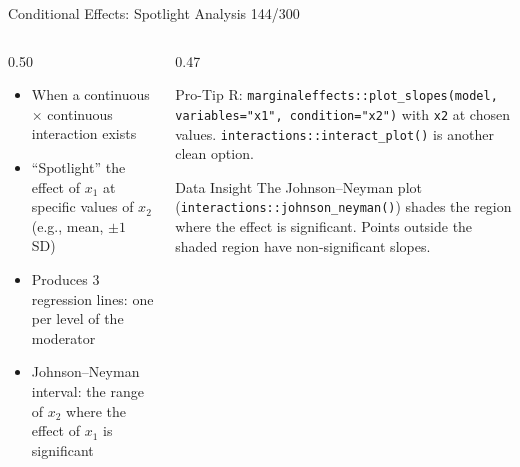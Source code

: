 \documentclass[10pt]{beamer}
\newcommand{\smark}[1]{\hfill{\scriptsize\color{codegray}#1}}
\begin{document}
\begin{frame}{Conditional Effects: Spotlight Analysis}
\smark{144/300}
\begin{columns}[T]
\begin{column}{0.50\textwidth}
\begin{itemize}
    \item When a continuous $\times$ continuous interaction exists
    \item ``Spotlight'' the effect of $x_1$ at specific values of $x_2$ (e.g., mean, $\pm 1$ SD)
    \item Produces 3 regression lines: one per level of the moderator
    \item Johnson--Neyman interval: the range of $x_2$ where the effect of $x_1$ is significant
\end{itemize}
\end{column}
\begin{column}{0.47\textwidth}
\begin{alertblock}{Pro-Tip}
    \scriptsize R: \texttt{marginaleffects::plot\_slopes(model, variables="x1", condition="x2")} with \texttt{x2} at chosen values. \texttt{interactions::interact\_plot()} is another clean option.
\end{alertblock}
\vspace{0.1cm}
\begin{exampleblock}{Data Insight}
    \scriptsize The Johnson--Neyman plot (\texttt{interactions::johnson\_neyman()}) shades the region where the effect is significant. Points outside the shaded region have non-significant slopes.
\end{exampleblock}
\end{column}
\end{columns}
\end{frame}
\end{document}
